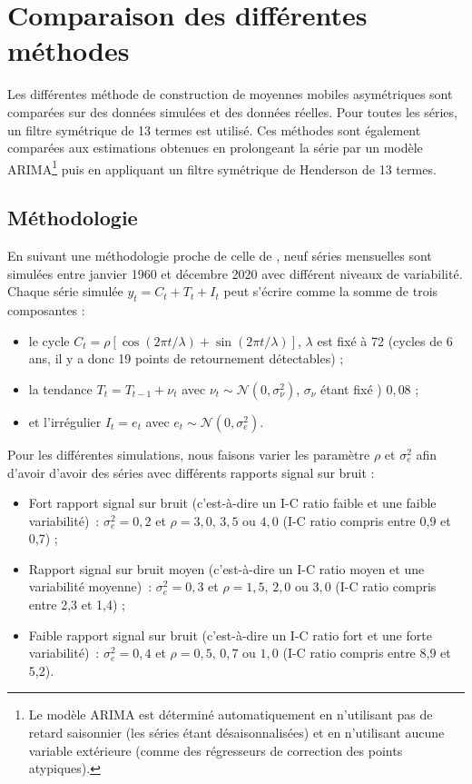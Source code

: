 \documentclass[
  12pt,
  a4paper,french]{article}
\newcommand\1{\mathds{1}}
\begin{document}
\hypertarget{sec-comparison}{%
\section{Comparaison des différentes méthodes}\label{sec-comparison}}

Les différentes méthode de construction de moyennes mobiles asymétriques sont comparées sur des données simulées et des données réelles.
Pour toutes les séries, un filtre symétrique de 13 termes est utilisé.
Ces méthodes sont également comparées aux estimations obtenues en prolongeant la série par un modèle ARIMA\footnote{Le modèle ARIMA est déterminé automatiquement en n'utilisant pas de retard saisonnier (les séries étant désaisonnalisées) et en n'utilisant aucune variable extérieure (comme des régresseurs de correction des points atypiques).} puis en appliquant un filtre symétrique de Henderson de 13 termes.

\hypertarget{muxe9thodologie}{%
\subsection{Méthodologie}\label{muxe9thodologie}}

En suivant une méthodologie proche de celle de \textcite{DarneDagum2009}, neuf séries mensuelles sont simulées entre janvier 1960 et décembre 2020 avec différent niveaux de variabilité. Chaque série simulée \(y_t= C_t+ T_t + I_t\) peut s'écrire comme la somme de trois composantes :

\begin{itemize}
\item
  le cycle \(C_t = \rho [\cos (2 \pi t / \lambda) +\sin (2 \pi t / \lambda)]\), \(\lambda\) est fixé à 72 (cycles de 6 ans, il y a donc 19 points de retournement détectables) ;
\item
  la tendance \(T_t = T_{t-1} + \nu_t\) avec \(\nu_t \sim \mathcal{N}(0, \sigma_\nu^2)\), \(\sigma_\nu\) étant fixé ) \(0,08\) ;
\item
  et l'irrégulier \(I_t = e_t\) avec \(e_t \sim \mathcal{N}(0, \sigma_e^2)\).
\end{itemize}

Pour les différentes simulations, nous faisons varier les paramètre \(\rho\) et \(\sigma_e^2\) afin d'avoir d'avoir des séries avec différents rapports signal sur bruit :

\begin{itemize}
\item
  Fort rapport signal sur bruit (c'est-à-dire un I-C ratio faible et une faible variabilité)~: \(\sigma_e^2=0,2\) et \(\rho = 3,0,\, 3,5\) ou \(4,0\) (I-C ratio compris entre 0,9 et 0,7) ;
\item
  Rapport signal sur bruit moyen (c'est-à-dire un I-C ratio moyen et une variabilité moyenne)~: \(\sigma_e^2=0,3\) et \(\rho = 1,5,\, 2,0\) ou \(3,0\) (I-C ratio compris entre 2,3 et 1,4) ;
\item
  Faible rapport signal sur bruit (c'est-à-dire un I-C ratio fort et une forte variabilité)~: \(\sigma_e^2=0,4\) et \(\rho = 0,5,\, 0,7\) ou \(1,0\) (I-C ratio compris entre 8,9 et 5,2).
\end{itemize}
\end{document}
